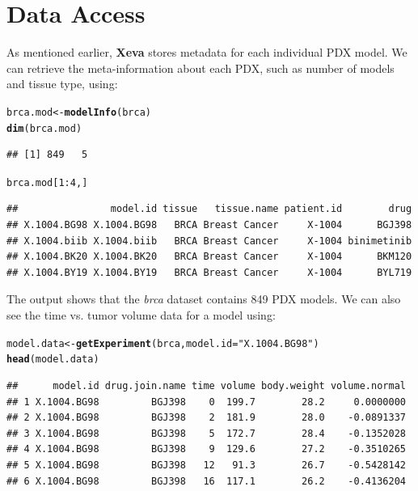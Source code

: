 \documentclass{article}\usepackage[]{graphicx}\usepackage[]{xcolor}
\makeatletter
\newcommand{\hlnum}[1]{\textcolor[rgb]{0.686,0.059,0.569}{#1}}%
\newcommand{\hlstr}[1]{\textcolor[rgb]{0.192,0.494,0.8}{#1}}%
\newcommand{\hlopt}[1]{\textcolor[rgb]{0,0,0}{#1}}%
\newcommand{\hlstd}[1]{\textcolor[rgb]{0.345,0.345,0.345}{#1}}%
\newcommand{\hlkwb}[1]{\textcolor[rgb]{0.69,0.353,0.396}{#1}}%
\newcommand{\hlkwc}[1]{\textcolor[rgb]{0.333,0.667,0.333}{#1}}%
\newcommand{\hlkwd}[1]{\textcolor[rgb]{0.737,0.353,0.396}{\textbf{#1}}}%
\newenvironment{kframe}{%
 \def\at@end@of@kframe{}%
 \ifinner\ifhmode%
  \def\at@end@of@kframe{\end{minipage}}%
  \begin{minipage}{\columnwidth}%
 \fi\fi%
 \def\FrameCommand##1{\hskip\@totalleftmargin \hskip-\fboxsep
 \colorbox{shadecolor}{##1}\hskip-\fboxsep
     \hskip-\linewidth \hskip-\@totalleftmargin \hskip\columnwidth}%
 \MakeFramed {\advance\hsize-\width
   \@totalleftmargin\z@ \linewidth\hsize
   \@setminipage}}%
 {\par\unskip\endMakeFramed%
 \at@end@of@kframe}
\newenvironment{knitrout}{}{} %
\makeatother
\begin{document}
\section{Data Access}
As mentioned earlier, \textbf{Xeva} stores metadata for each individual PDX model.
We can retrieve the meta-information about each PDX, such as number of models and tissue type, using:
\begin{knitrout}
\color{fgcolor}\begin{kframe}
\begin{alltt}
\hlstd{brca.mod} \hlkwb{<-} \hlkwd{modelInfo}\hlstd{(brca)}
\hlkwd{dim}\hlstd{(brca.mod)}
\end{alltt}
\begin{verbatim}
## [1] 849   5
\end{verbatim}
\begin{alltt}
\hlstd{brca.mod[}\hlnum{1}\hlopt{:}\hlnum{4}\hlstd{, ]}
\end{alltt}
\begin{verbatim}
##                model.id tissue   tissue.name patient.id        drug
## X.1004.BG98 X.1004.BG98   BRCA Breast Cancer     X-1004      BGJ398
## X.1004.biib X.1004.biib   BRCA Breast Cancer     X-1004 binimetinib
## X.1004.BK20 X.1004.BK20   BRCA Breast Cancer     X-1004      BKM120
## X.1004.BY19 X.1004.BY19   BRCA Breast Cancer     X-1004      BYL719
\end{verbatim}
\end{kframe}
\end{knitrout}
The output shows that the \textit{brca} dataset contains 849 PDX models.
We can also see the time vs. tumor volume data for a model using:

\begin{knitrout}
\color{fgcolor}\begin{kframe}
\begin{alltt}
\hlstd{model.data} \hlkwb{<-} \hlkwd{getExperiment}\hlstd{(brca,} \hlkwc{model.id} \hlstd{=} \hlstr{"X.1004.BG98"}\hlstd{)}
\hlkwd{head}\hlstd{(model.data)}
\end{alltt}
\begin{verbatim}
##      model.id drug.join.name time volume body.weight volume.normal
## 1 X.1004.BG98         BGJ398    0  199.7        28.2     0.0000000
## 2 X.1004.BG98         BGJ398    2  181.9        28.0    -0.0891337
## 3 X.1004.BG98         BGJ398    5  172.7        28.4    -0.1352028
## 4 X.1004.BG98         BGJ398    9  129.6        27.2    -0.3510265
## 5 X.1004.BG98         BGJ398   12   91.3        26.7    -0.5428142
## 6 X.1004.BG98         BGJ398   16  117.1        26.2    -0.4136204
\end{verbatim}
\end{kframe}
\end{knitrout}
\end{document}
